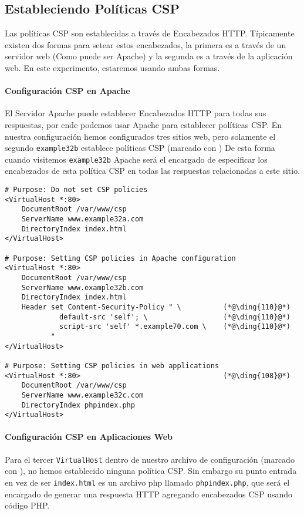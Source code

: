 \subsection{Estableciendo Políticas CSP}  

Las políticas CSP son establecidas a través de Encabezados HTTP. Típicamente existen dos formas para setear estos encabezados, la primera es a través de un servidor web (Como puede ser Apache) y la segunda es a través de la aplicación web.
En este experimento, estaremos usando ambas formas.

\paragraph{Configuración CSP en Apache}
El Servidor Apache puede establecer Encabezados HTTP para todas sus respuestas, por ende podemos usar Apache para establecer políticas CSP. En nuestra configuración hemos configurados tres sitios web, pero solamente el segundo \texttt{example32b}  establece políticas CSP (marcado con )
De esta forma cuando visitemos  \texttt{example32b} Apache será el encargado de especificar los encabezados de esta política CSP en todas las respuestas relacionadas a este sitio.


\begin{lstlisting}
# Purpose: Do not set CSP policies
<VirtualHost *:80>
    DocumentRoot /var/www/csp
    ServerName www.example32a.com
    DirectoryIndex index.html
</VirtualHost>

# Purpose: Setting CSP policies in Apache configuration
<VirtualHost *:80>
    DocumentRoot /var/www/csp
    ServerName www.example32b.com
    DirectoryIndex index.html
    Header set Content-Security-Policy " \          (*@\ding{110}@*)
             default-src 'self'; \                  (*@\ding{110}@*)
             script-src 'self' *.example70.com \    (*@\ding{110}@*)
           "
</VirtualHost>

# Purpose: Setting CSP policies in web applications
<VirtualHost *:80>                                  (*@\ding{108}@*)
    DocumentRoot /var/www/csp
    ServerName www.example32c.com
    DirectoryIndex phpindex.php
</VirtualHost>
\end{lstlisting}
 

\paragraph{Configuración CSP en Aplicaciones Web}
Para el tercer \texttt{VirtualHost} dentro de nuestro archivo de configuración (marcado con ), no hemos establecido ninguna política CSP.
Sin embargo su punto entrada en vez de ser \texttt{index.html} es un archivo php llamado  \texttt{phpindex.php}, que será el encargado de generar una respuesta HTTP agregando encabezados CSP usando código PHP.

